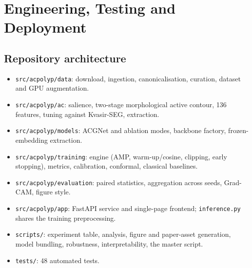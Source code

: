\chapter{Engineering, Testing and Deployment}
\section{Repository architecture}
\begin{itemize}
\item \texttt{src/acpolyp/data}: download, ingestion, canonicalisation, curation, dataset and GPU augmentation.
\item \texttt{src/acpolyp/ac}: salience, two-stage morphological active contour, 136 features, tuning against Kvasir-SEG, extraction.
\item \texttt{src/acpolyp/models}: ACGNet and ablation modes, backbone factory, frozen-embedding extraction.
\item \texttt{src/acpolyp/training}: engine (AMP, warm-up/cosine, clipping, early stopping), metrics, calibration, conformal, classical baselines.
\item \texttt{src/acpolyp/evaluation}: paired statistics, aggregation across seeds, Grad-CAM, figure style.
\item \texttt{src/acpolyp/app}: FastAPI service and single-page frontend; \texttt{inference.py} shares the training preprocessing.
\item \texttt{scripts/}: experiment table, analysis, figure and paper-asset generation, model bundling, robustness, interpretability, the master script.
\item \texttt{tests/}: 48 automated tests.
\end{itemize}

